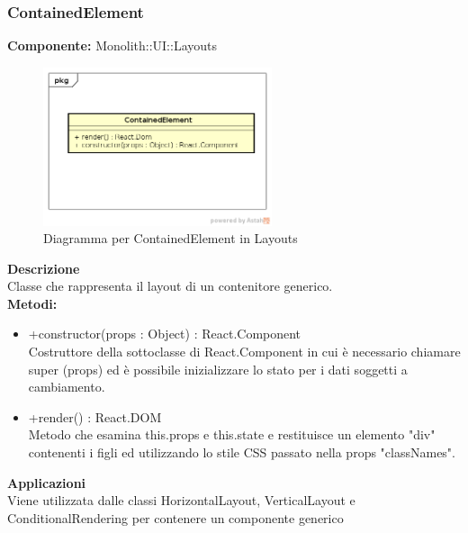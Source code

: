 \clearpage

\subsubsection{ContainedElement}
\textbf{Componente:}  Monolith::UI::Layouts\\
   \FloatBarrier
   \begin{figure}[ht]
   \centering
   \includegraphics[width=0.6\textwidth]{img/single-ContainedElement}
   \caption{{Diagramma per ContainedElement in Layouts}}
\end{figure}
\FloatBarrier
\textbf{Descrizione}\\
Classe che rappresenta il layout di un contenitore generico. \\
\textbf{Metodi:} 
\begin{itemize}

\item +constructor(props : Object) : React.Component 
\\
Costruttore della sottoclasse di React.Component in cui è necessario chiamare super (props) ed è possibile inizializzare lo stato per i dati soggetti a cambiamento.

\item +render() : React.DOM 
\\
Metodo che esamina this.props e this.state e restituisce un elemento "div" contenenti i figli ed utilizzando lo stile CSS passato nella props "classNames".

\end{itemize} 


\textbf{Applicazioni}\\
Viene utilizzata dalle classi HorizontalLayout, VerticalLayout e ConditionalRendering per contenere un componente generico 


\clearpage

